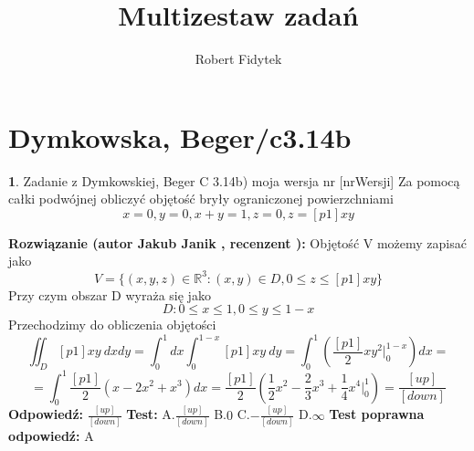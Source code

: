 \documentclass[12pt, a4paper]{article}
\title{Multizestaw zadań}
\author{Robert Fidytek}
\date{}
\theoremstyle{definition} %
\newtheorem{zad}{}
\newcommand{\kategoria}[1]{\section{#1}} %
\newcommand{\zadStart}[1]{\begin{zad}#1\newline} %
\newcommand{\zadStop}{\end{zad}}   %
\newcommand{\rozwStart}[2]{\noindent \textbf{Rozwiązanie (autor #1 , recenzent #2): }\newline} %
\newcommand{\rozwStop}{\newline}                                            %
\newcommand{\odpStart}{\noindent \textbf{Odpowiedź:}\newline}    %
\newcommand{\odpStop}{\newline}                                             %
\newcommand{\testStart}{\noindent \textbf{Test:}\newline} %
\newcommand{\testStop}{\newline} %
\newcommand{\kluczStart}{\noindent \textbf{Test poprawna odpowiedź:}\newline} %
\newcommand{\kluczStop}{\newline} %
\begin{document}
\maketitle


\kategoria{Dymkowska, Beger/c3.14b}
\zadStart{Zadanie z Dymkowskiej, Beger C 3.14b) moja wersja nr [nrWersji]}
Za pomocą całki podwójnej obliczyć objętość bryły ograniczonej powierzchniami $$x=0, y=0, x+y=1, z=0, z=[p1]xy$$
\zadStop
\rozwStart{Jakub Janik}{}
Objętość V możemy zapisać jako
$$V=\{(x,y,z)\in\mathbb{R}^3\colon(x,y)\in D, 0 \leq z \leq [p1]xy\}$$
Przy czym obszar D wyraża się jako
$$D\colon 0 \leq x \leq 1, 0 \leq y \leq 1-x$$
Przechodzimy do obliczenia objętości
$$\iint_D [p1]xy\ dxdy=\int_0^1 dx\int_0^{1-x}[p1]xy\ dy=\int_0^1(\frac{[p1]}{2}xy^2\Big|_0^{1-x})dx=$$
$$=\int_0^1\frac{[p1]}{2}(x-2x^2+x^3)dx=\frac{[p1]}{2}(\frac{1}{2}x^2-\frac{2}{3}x^3+\frac{1}{4}x^4\Big|_0^1)=\frac{[up]}{[down]}$$
\rozwStop
\odpStart
$\frac{[up]}{[down]}$
\odpStop
\testStart
A.$\frac{[up]}{[down]}$
B.$0$
C.$-\frac{[up]}{[down]}$
D.$\infty$
\testStop
\kluczStart
A
\kluczStop
\end{document}
